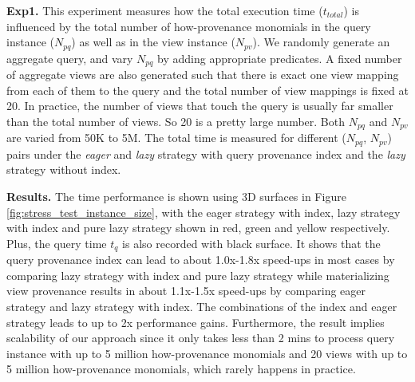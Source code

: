 \textbf{Exp1.}  This experiment measures how the total execution time ($t_{total}$) is influenced by the total number of how-provenance monomials in the query instance ($N_{pq}$) as well as 
in the view instance ($N_{pv}$). We randomly generate an aggregate query, and vary $N_{pq}$ by adding appropriate predicates. A fixed number of aggregate views are also generated such that there is exact one view mapping from each of them to the query and the total number of view mappings is fixed at 20.  In practice, the number of views that touch the query is usually far smaller than the total number of views. So 20 is a pretty large number. Both $N_{pq}$ and $N_{pv}$ are varied from 50K to 5M. The total time is measured for different ($N_{pq}$, $N_{pv}$) pairs under the {\em eager} and {\em lazy} strategy with query provenance index and the {\em lazy} strategy without index. 

\textbf{Results.} 
The time performance is shown using 3D surfaces in Figure \ref{fig:stress_test_instance_size}, with the eager strategy with index, lazy strategy with index and pure lazy strategy shown in red, green and yellow respectively. Plus, the query time $t_q$ is also recorded with black surface. It shows that the query provenance index can lead to about 1.0x-1.8x speed-ups in most cases by comparing lazy strategy with index and pure lazy strategy while materializing view provenance results in about 1.1x-1.5x speed-ups by comparing eager strategy and lazy strategy with index.  The combinations of the index and eager strategy leads to up to 2x performance gains. Furthermore, the result implies scalability of our approach since it only takes less than 2 mins to process query instance with up to 5 million how-provenance monomials and 20 views with up to 5 million how-provenance monomials, which rarely happens in practice. 


